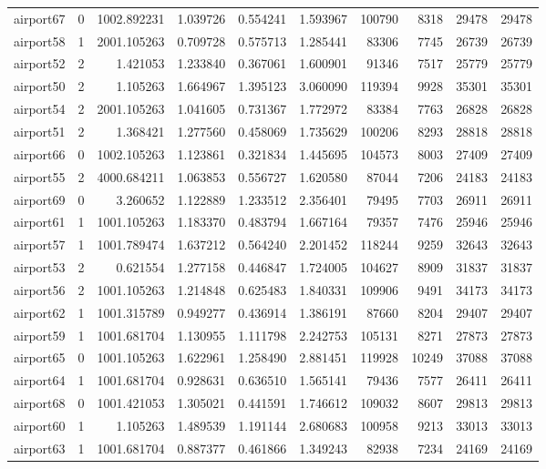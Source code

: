 \begin{longtable}{|l|r|r|r|r|r|r|r|r|r|}
airport67 & 0 & 1002.892231 & 1.039726 & 0.554241 & 1.593967 & 100790 & 8318 & 29478 & 29478 \\
airport58 & 1 & 2001.105263 & 0.709728 & 0.575713 & 1.285441 & 83306 & 7745 & 26739 & 26739 \\
airport52 & 2 & 1.421053 & 1.233840 & 0.367061 & 1.600901 & 91346 & 7517 & 25779 & 25779 \\
airport50 & 2 & 1.105263 & 1.664967 & 1.395123 & 3.060090 & 119394 & 9928 & 35301 & 35301 \\
airport54 & 2 & 2001.105263 & 1.041605 & 0.731367 & 1.772972 & 83384 & 7763 & 26828 & 26828 \\
airport51 & 2 & 1.368421 & 1.277560 & 0.458069 & 1.735629 & 100206 & 8293 & 28818 & 28818 \\
airport66 & 0 & 1002.105263 & 1.123861 & 0.321834 & 1.445695 & 104573 & 8003 & 27409 & 27409 \\
airport55 & 2 & 4000.684211 & 1.063853 & 0.556727 & 1.620580 & 87044 & 7206 & 24183 & 24183 \\
airport69 & 0 & 3.260652 & 1.122889 & 1.233512 & 2.356401 & 79495 & 7703 & 26911 & 26911 \\
airport61 & 1 & 1001.105263 & 1.183370 & 0.483794 & 1.667164 & 79357 & 7476 & 25946 & 25946 \\
airport57 & 1 & 1001.789474 & 1.637212 & 0.564240 & 2.201452 & 118244 & 9259 & 32643 & 32643 \\
airport53 & 2 & 0.621554 & 1.277158 & 0.446847 & 1.724005 & 104627 & 8909 & 31837 & 31837 \\
airport56 & 2 & 1001.105263 & 1.214848 & 0.625483 & 1.840331 & 109906 & 9491 & 34173 & 34173 \\
airport62 & 1 & 1001.315789 & 0.949277 & 0.436914 & 1.386191 & 87660 & 8204 & 29407 & 29407 \\
airport59 & 1 & 1001.681704 & 1.130955 & 1.111798 & 2.242753 & 105131 & 8271 & 27873 & 27873 \\
airport65 & 0 & 1001.105263 & 1.622961 & 1.258490 & 2.881451 & 119928 & 10249 & 37088 & 37088 \\
airport64 & 1 & 1001.681704 & 0.928631 & 0.636510 & 1.565141 & 79436 & 7577 & 26411 & 26411 \\
airport68 & 0 & 1001.421053 & 1.305021 & 0.441591 & 1.746612 & 109032 & 8607 & 29813 & 29813 \\
airport60 & 1 & 1.105263 & 1.489539 & 1.191144 & 2.680683 & 100958 & 9213 & 33013 & 33013 \\
airport63 & 1 & 1001.681704 & 0.887377 & 0.461866 & 1.349243 & 82938 & 7234 & 24169 & 24169 \\

\end{longtable}
